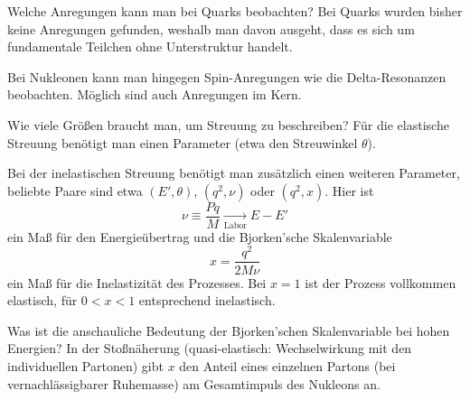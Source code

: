 \begin{fquestion}{Welche Anregungen kann man bei Quarks beobachten?}
    Bei Quarks wurden bisher keine Anregungen gefunden, weshalb man davon ausgeht, dass es sich um fundamentale Teilchen ohne Unterstruktur handelt.
    
    Bei Nukleonen kann man hingegen Spin-Anregungen wie die Delta-Resonanzen beobachten.
    Möglich sind auch Anregungen im Kern.
\end{fquestion}

\begin{fquestion}{Wie viele Größen braucht man, um Streuung zu beschreiben?}
    Für die elastische Streuung benötigt man einen Parameter (etwa den Streuwinkel $\theta$).
    
    Bei der inelastischen Streuung benötigt man zusätzlich einen weiteren Parameter, beliebte Paare sind etwa $(E', \theta)$, $(q^2, \nu)$ oder $(q^2, x)$.
    Hier ist 
    $$\nu \equiv \frac{Pq}{M} \xrightarrow[\text{Labor}]{} E - E'$$
    ein Maß für den Energieübertrag und die Bjorken'sche Skalenvariable
    $$x = \frac{q^2}{2 M \nu}$$
    ein Maß für die Inelastizität des Prozesses.
    Bei $x=1$ ist der Prozess vollkommen elastisch, für $0 < x < 1$ entsprechend inelastisch.
\end{fquestion}

\begin{fquestion}{Was ist die anschauliche Bedeutung der Bjorken'schen Skalenvariable bei hohen Energien?}
    In der Stoßnäherung (quasi-elastisch: Wechselwirkung mit den individuellen Partonen) gibt $x$ den Anteil eines einzelnen Partons (bei vernachlässigbarer Ruhemasse) am Gesamtimpuls des Nukleons an.
\end{fquestion}